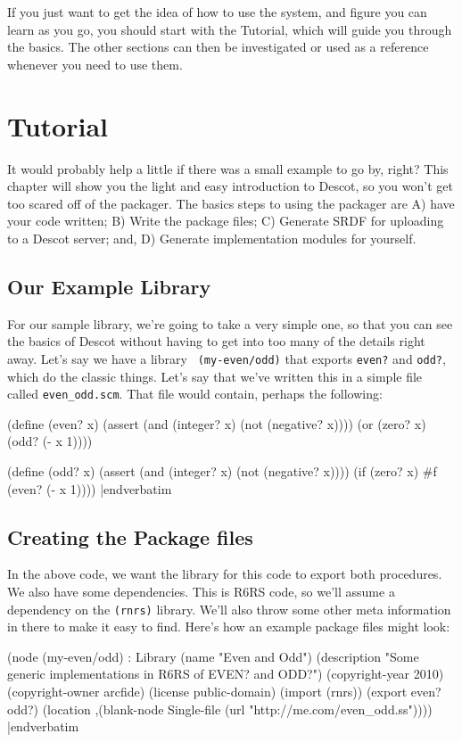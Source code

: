 If you just want to get the idea of how to use the system, and figure
you can learn as you go, you should start with the Tutorial, which
will guide you through the basics. The other sections can then be
investigated or used as a reference whenever you need to use them.
 
\chapter{Tutorial}{}%

It would probably help a little if there was a small example to go by,
right? This chapter will show you the light and easy introduction to
Descot, so you won't get too scared off of the packager. The basics
steps to using the packager are A) have your code written; B) Write
the package files; C) Generate SRDF for uploading to a Descot server;
and, D) Generate implementation modules for yourself. 

\section{Our Example Library}{}%
For our sample library, we're going to take a very simple one, so that
you can see the basics of Descot without having to get into too many
of the details right away. Let's say we have a library {\tt
(my-even/odd)} that exports {\tt even?} and {\tt odd?}, which do the
classic things. Let's say that we've written this in a simple file
called {\tt even\_odd.scm}. That file would contain, perhaps the
following:
 
\medskip\verbatim
(define (even? x)
  (assert (and (integer? x) (not (negative? x))))
  (or (zero? x) (odd? (- x 1))))

(define (odd? x)
  (assert (and (integer? x) (not (negative? x))))
  (if (zero? x) #f (even? (- x 1))))
|endverbatim
\medskip

\section{Creating the Package files}{}%
In the above code, we want the library for this code to export both
procedures. We also have some dependencies. This is R6RS code, so
we'll assume a dependency on the {\tt (rnrs)} library. We'll also
throw some other meta information in there to make it easy to find.
Here's how an example package files might look:
 
\medskip\verbatim
(node (my-even/odd) : Library
  (name "Even and Odd")
  (description
    "Some generic implementations in R6RS of EVEN? and ODD?")
  (copyright-year 2010)
  (copyright-owner arcfide)
  (license public-domain)
  (import (rnrs))
  (export even? odd?)
  (location 
    ,(blank-node Single-file 
       (url "http://me.com/even_odd.ss"))))
|endverbatim
\medskip

